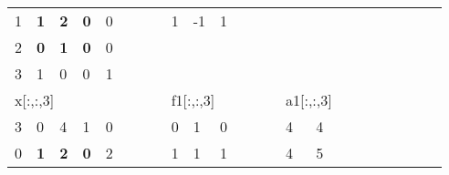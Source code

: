 \begin{table}[h]
{\begin{tabular}{lllllllllllllllllllllll}
\multicolumn{1}{|l|}{1} & \multicolumn{1}{l|}{\textbf{1}} & \multicolumn{1}{l|}{\textbf{2}} & \multicolumn{1}{l|}{\textbf{0}} & \multicolumn{1}{l|}{0} &  &  & \multicolumn{1}{l|}{} & \multicolumn{1}{l|}{1}  & \multicolumn{1}{l|}{-1} & \multicolumn{1}{l|}{1}  &  &  &                       &                         &                        &  &  &                       &                        &                         &  &  \\ \cline{1-5} \cline{9-11}
\multicolumn{1}{|l|}{2} & \multicolumn{1}{l|}{\textbf{0}} & \multicolumn{1}{l|}{\textbf{1}} & \multicolumn{1}{l|}{\textbf{0}} & \multicolumn{1}{l|}{0} &  &  &                       &                         &                         &                         &  &  &                       &                         &                        &  &  &                       &                        &                         &  &  \\ \cline{1-5}
\multicolumn{1}{|l|}{3} & \multicolumn{1}{l|}{1}          & \multicolumn{1}{l|}{0}          & \multicolumn{1}{l|}{0}          & \multicolumn{1}{l|}{1} &  &  &                       &                         &                         &                         &  &  &                       &                         &                        &  &  &                       &                        &                         &  &  \\ \cline{1-5}
\multicolumn{5}{l}{x{[}:,:,3{]}}                                                                                                                       &  &  &                       & \multicolumn{3}{l}{f1{[}:,:,3{]}}                                           &  &  &                       & \multicolumn{2}{l}{a1{[}:,:,3{]}}                &  &  &                       &                        &                         &  &  \\ \cline{1-5} \cline{9-11} \cline{15-16}
\multicolumn{1}{|l|}{3} & \multicolumn{1}{l|}{0}          & \multicolumn{1}{l|}{4}          & \multicolumn{1}{l|}{1}          & \multicolumn{1}{l|}{0} &  &  & \multicolumn{1}{l|}{} & \multicolumn{1}{l|}{0}  & \multicolumn{1}{l|}{1}  & \multicolumn{1}{l|}{0}  &  &  & \multicolumn{1}{l|}{} & \multicolumn{1}{l|}{4}  & \multicolumn{1}{l|}{4} &  &  &                       &                        &                         &  &  \\ \cline{1-5} \cline{9-11} \cline{15-16}
\multicolumn{1}{|l|}{0} & \multicolumn{1}{l|}{\textbf{1}} & \multicolumn{1}{l|}{\textbf{2}} & \multicolumn{1}{l|}{\textbf{0}} & \multicolumn{1}{l|}{2} &  &  & \multicolumn{1}{l|}{} & \multicolumn{1}{l|}{1}  & \multicolumn{1}{l|}{1}  & \multicolumn{1}{l|}{1}  &  &  & \multicolumn{1}{l|}{} & \multicolumn{1}{l|}{4}  & \multicolumn{1}{l|}{5} &  &  &                       &                        &                         &  &  \\ \cline{1-5} \cline{9-11} \cline{15-16}

\end{tabular}}
\end{table}
